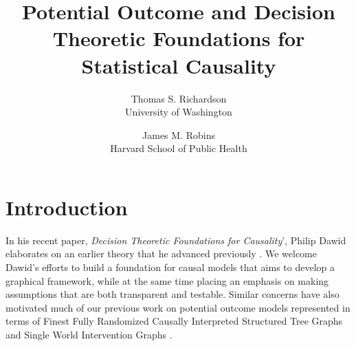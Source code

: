 \documentclass[11pt]{article}
\begin{document}
\title{
Potential Outcome and Decision Theoretic Foundations for Statistical Causality}
\author{Thomas S. Richardson\\ University of Washington \and James M. Robins\\ Harvard School of Public Health} 






\maketitle

\section{Introduction}

In his recent paper, {\it Decision Theoretic Foundations for Causality}', Philip Dawid elaborates on an earlier theory that he advanced previously \citep{dawid02influence}. We welcome Dawid's efforts to build a foundation for causal models that aims  to develop a graphical framework, while at the same time placing an emphasis on making assumptions that are both transparent and testable. Similar concerns have also motivated much of our previous work on potential outcome models represented in terms of Finest Fully Randomized Causally Interpreted Structured Tree Graphs \citep{robins86new}  and Single World Intervention Graphs
 \citep{thomas13swig}.
\end{document}
